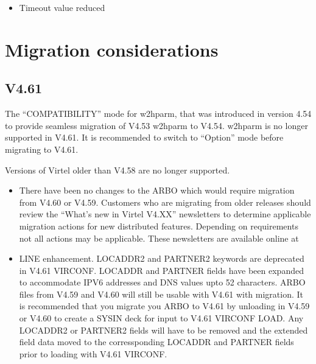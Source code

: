 \documentclass[letterpaper,10pt,english]{sphinxmanual}
\begin{document}
\begin{itemize}
\item {} 
Timeout value reduced

\end{itemize}


\chapter{Migration considerations}
\label{\detokenize{TN202101:migration-considerations}}

\section{V4.61}
\label{\detokenize{TN202101:v4-61}}

The “COMPATIBILITY” mode for w2hparm, that was introduced in version 4.54 to provide seamless migration of V4.53 w2hparm to V4.54. w2hparm is no longer supported in V4.61. It is recommended to switch to “Option” mode before migrating to V4.61.


Versions of Virtel older than V4.58 are no longer supported.

\begin{itemize}
\item {} 
There have been no changes to the ARBO which would require migration from V4.60 or V4.59. Customers who are migrating from older releases should review the “What’s new in Virtel V4.XX” newsletters to determine applicable migration actions for new distributed features. Depending on requirements not all actions may be applicable. These newsletters are available online at 

\item {} 
LINE enhancement. LOCADDR2 and PARTNER2 keywords are deprecated in V4.61 VIRCONF. LOCADDR and PARTNER fields have been expanded to accommodate IPV6 addresses and DNS values upto 52 characters. ARBO files from V4.59 and V4.60 will still be usable with V4.61 with migration. It is recommended that you migrate you ARBO to V4.61 by unloading in V4.59 or V4.60 to create a SYSIN deck for input to V4.61 VIRCONF LOAD. Any LOCADDR2 or PARTNER2 fields will have to be removed and the extended field data moved to the corressponding LOCADDR and PARTNER fields prior to loading with V4.61 VIRCONF.

\end{itemize}
\end{document}

